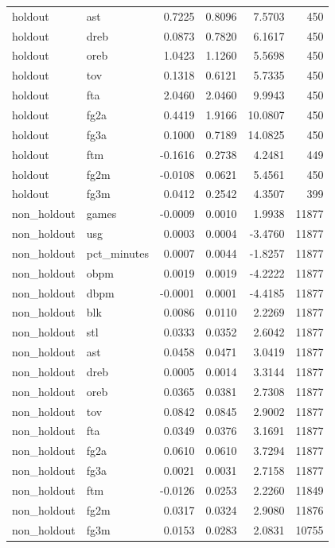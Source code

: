 \begin{table}
\begin{tabular}{llrrrr}
holdout & ast & 0.7225 & 0.8096 & 7.5703 & 450 \\
holdout & dreb & 0.0873 & 0.7820 & 6.1617 & 450 \\
holdout & oreb & 1.0423 & 1.1260 & 5.5698 & 450 \\
holdout & tov & 0.1318 & 0.6121 & 5.7335 & 450 \\
holdout & fta & 2.0460 & 2.0460 & 9.9943 & 450 \\
holdout & fg2a & 0.4419 & 1.9166 & 10.0807 & 450 \\
holdout & fg3a & 0.1000 & 0.7189 & 14.0825 & 450 \\
holdout & ftm & -0.1616 & 0.2738 & 4.2481 & 449 \\
holdout & fg2m & -0.0108 & 0.0621 & 5.4561 & 450 \\
holdout & fg3m & 0.0412 & 0.2542 & 4.3507 & 399 \\
non\_holdout & games & -0.0009 & 0.0010 & 1.9938 & 11877 \\
non\_holdout & usg & 0.0003 & 0.0004 & -3.4760 & 11877 \\
non\_holdout & pct\_minutes & 0.0007 & 0.0044 & -1.8257 & 11877 \\
non\_holdout & obpm & 0.0019 & 0.0019 & -4.2222 & 11877 \\
non\_holdout & dbpm & -0.0001 & 0.0001 & -4.4185 & 11877 \\
non\_holdout & blk & 0.0086 & 0.0110 & 2.2269 & 11877 \\
non\_holdout & stl & 0.0333 & 0.0352 & 2.6042 & 11877 \\
non\_holdout & ast & 0.0458 & 0.0471 & 3.0419 & 11877 \\
non\_holdout & dreb & 0.0005 & 0.0014 & 3.3144 & 11877 \\
non\_holdout & oreb & 0.0365 & 0.0381 & 2.7308 & 11877 \\
non\_holdout & tov & 0.0842 & 0.0845 & 2.9002 & 11877 \\
non\_holdout & fta & 0.0349 & 0.0376 & 3.1691 & 11877 \\
non\_holdout & fg2a & 0.0610 & 0.0610 & 3.7294 & 11877 \\
non\_holdout & fg3a & 0.0021 & 0.0031 & 2.7158 & 11877 \\
non\_holdout & ftm & -0.0126 & 0.0253 & 2.2260 & 11849 \\
non\_holdout & fg2m & 0.0317 & 0.0324 & 2.9080 & 11876 \\
non\_holdout & fg3m & 0.0153 & 0.0283 & 2.0831 & 10755 \\
\bottomrule
\end{tabular}
\end{table}
